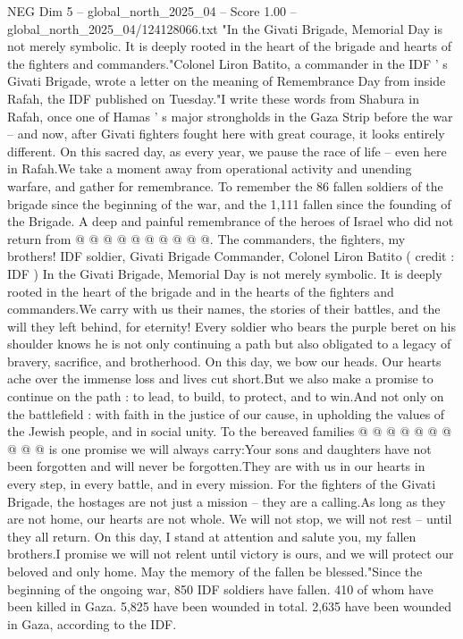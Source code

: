 \begin{textsample}{NEG Dim 5 – global\_north\_2025\_04 – Score 1.00 – global\_north\_2025\_04/124128066.txt}  \label{ex:f5_neg_344}
"In the Givati Brigade, Memorial Day is not merely symbolic.
It is deeply rooted in the heart of the brigade and hearts of the fighters and commanders."Colonel Liron Batito, a commander in the IDF ' s Givati Brigade, wrote a letter on the meaning of Remembrance Day from inside Rafah, the IDF published on Tuesday."I write these words from Shabura in Rafah, once one of Hamas ' s major strongholds in the Gaza Strip before the war -- and now, after Givati fighters fought here with great courage, it looks entirely different.
On this sacred day, as every year, we pause the race of life -- even here in Rafah.We take a moment away from operational activity and unending warfare, and gather for remembrance.
To remember the 86 fallen soldiers of the brigade since the beginning of the war, and the 1,111 fallen since the founding of the Brigade.
A deep and painful remembrance of the heroes of Israel who did not return from @ @ @ @ @ @ @ @ @ @.
The commanders, the fighters, my brothers!
IDF soldier, Givati Brigade Commander, Colonel Liron Batito ( credit : IDF ) In the Givati Brigade, Memorial Day is not merely symbolic.
It is deeply rooted in the heart of the brigade and in the hearts of the fighters and commanders.We carry with us their names, the stories of their battles, and the will they left behind, for eternity!
Every soldier who bears the purple beret on his shoulder knows he is not only continuing a path but also obligated to a legacy of bravery, sacrifice, and brotherhood.
On this day, we bow our heads.
Our hearts ache over the immense loss and lives cut short.But we also make a promise to continue on the path : to lead, to build, to protect, and to win.And not only on the battlefield : with faith in the justice of our cause, in upholding the values of the Jewish people, and in social unity.
To the bereaved families @ @ @ @ @ @ @ @ @ @ is one promise we will always carry:Your sons and daughters have not been forgotten and will never be forgotten.They are with us in our hearts in every step, in every battle, and in every mission.
For the fighters of the Givati Brigade, the hostages are not just a mission -- they are a calling.As long as they are not home, our hearts are not whole.
We will not stop, we will not rest -- until they all return.
On this day, I stand at attention and salute you, my fallen brothers.I promise we will not relent until victory is ours, and we will protect our beloved and only home.
May the memory of the fallen be blessed."Since the beginning of the ongoing war, 850 IDF soldiers have fallen. 410 of whom have been killed in Gaza. 5,825 have been wounded in total. 2,635 have been wounded in Gaza, according to the IDF.

\end{textsample}
